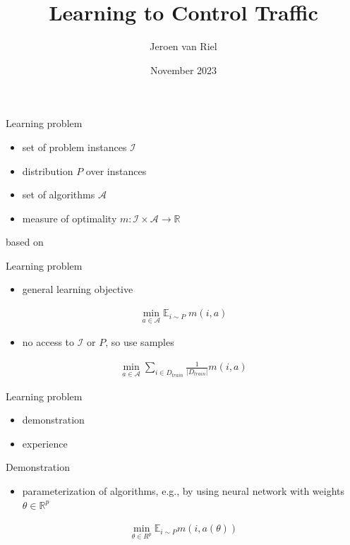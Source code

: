 \documentclass[bigger]{beamer}
\author{Jeroen van Riel}
\date{November 2023}
\title{Learning to Control Traffic}
\begin{document}
\maketitle

\begin{frame}[label={sec:org0e15610}]{Learning problem}
\begin{itemize}
\item set of problem instances \(\mathcal{I}\)
\item distribution \(P\) over instances
\item set of algorithms \(\mathcal{A}\)
\item measure of optimality \(m : \mathcal{I} \times \mathcal{A} \rightarrow \mathbb{R}\)
\end{itemize}

\vfill
based on \citep{bengioMachineLearningCombinatorial2020} 
\end{frame}
\begin{frame}[label={sec:org46a2ad2}]{Learning problem}
\begin{itemize}
\item general learning objective
\end{itemize}
\begin{align}
\min_{a \in \mathcal{A}} \mathbb{E}_{i \sim P} \; m(i, a)
\end{align}

\begin{itemize}
\item no access to \(\mathcal{I}\) or \(P\), so use samples
\end{itemize}
\begin{align}
\min_{a \in \mathcal{A}} \sum_{i \in D_{\mathit{train}}} \frac{1}{|D_\mathit{train}|} m(i, a)
\end{align}
\end{frame}

\begin{frame}[label={sec:orgefe7fb3}]{Learning problem}
\begin{itemize}
\item demonstration
\item experience
\end{itemize}
\end{frame}


\begin{frame}[label={sec:orge4c6b7c}]{Demonstration}
\begin{itemize}
\item parameterization of algorithms, e.g., by using neural network with weights \(\theta \in \mathbb{R}^p\)
\end{itemize}
\begin{align}
\min_{\theta \in R^p} \mathbb{E}_{i \sim P} m(i, a(\theta))
\end{align}
\end{frame}
\end{document}
